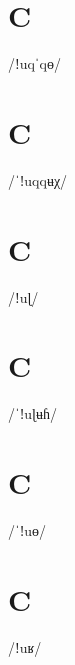 \documentclass[10pt,a4paper,twoside]{book}
\begin{document}
\section*{C}

\begin{multicols}{3}
 {/ǃuqˈqɵ/} {}
\end{multicols}

\section*{C}

\begin{multicols}{3}
 {/ˈǃuqqʉχ/} {}
\end{multicols}

\section*{C}

\begin{multicols}{3}
 {/ǃuɭ/} {}
\end{multicols}

\section*{C}

\begin{multicols}{3}
 {/ˈǃuɭʉɦ/} {}
\end{multicols}

\section*{C}

\begin{multicols}{3}
 {/ˈǃuɵ/} {}
\end{multicols}

\section*{C}

\begin{multicols}{3}
 {/ǃuʁ/} {}
\end{multicols}
\end{document}
